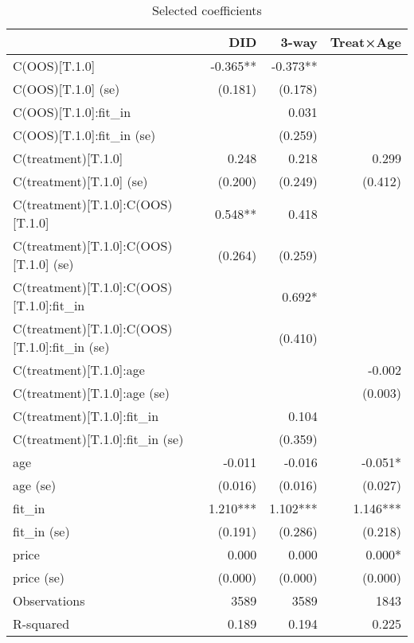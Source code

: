 \begin{table}[htbp]
\centering
\begin{tabular}{lrrr}
\toprule
 & DID & 3-way & Treat×Age \\
\midrule
C(OOS)[T.1.0] & -0.365** & -0.373** &  \\
C(OOS)[T.1.0] (se) & (0.181) & (0.178) &  \\
C(OOS)[T.1.0]:fit\_in &  & 0.031 &  \\
C(OOS)[T.1.0]:fit\_in (se) &  & (0.259) &  \\
C(treatment)[T.1.0] & 0.248 & 0.218 & 0.299 \\
C(treatment)[T.1.0] (se) & (0.200) & (0.249) & (0.412) \\
C(treatment)[T.1.0]:C(OOS)[T.1.0] & 0.548** & 0.418 &  \\
C(treatment)[T.1.0]:C(OOS)[T.1.0] (se) & (0.264) & (0.259) &  \\
C(treatment)[T.1.0]:C(OOS)[T.1.0]:fit\_in &  & 0.692* &  \\
C(treatment)[T.1.0]:C(OOS)[T.1.0]:fit\_in (se) &  & (0.410) &  \\
C(treatment)[T.1.0]:age &  &  & -0.002 \\
C(treatment)[T.1.0]:age (se) &  &  & (0.003) \\
C(treatment)[T.1.0]:fit\_in &  & 0.104 &  \\
C(treatment)[T.1.0]:fit\_in (se) &  & (0.359) &  \\
age & -0.011 & -0.016 & -0.051* \\
age (se) & (0.016) & (0.016) & (0.027) \\
fit\_in & 1.210*** & 1.102*** & 1.146*** \\
fit\_in (se) & (0.191) & (0.286) & (0.218) \\
price & 0.000 & 0.000 & 0.000* \\
price (se) & (0.000) & (0.000) & (0.000) \\
Observations & 3589 & 3589 & 1843 \\
R-squared & 0.189 & 0.194 & 0.225 \\
\bottomrule
\end{tabular}

\caption{Selected coefficients}
\label{tab:selected_models}
\end{table}
